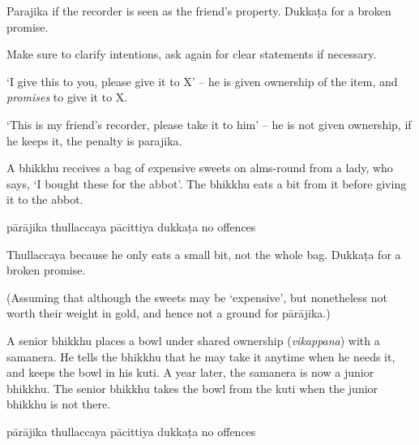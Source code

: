 \begin{exam}{\autoExamName}
\begin{problem*}
\begin{parts}
  \begin{solution}
    Parajika if the recorder is seen as the friend's property.
    Dukkaṭa for a broken promise.

    Make sure to clarify intentions, ask again for
    clear statements if necessary.

    `I give this to you, please give it to X' -- he is given ownership of the
    item, and \emph{promises} to give it to X.

    `This is my friend's recorder, please take it to him' -- he is not given
    ownership, if he keeps it, the penalty is parajika.
  \end{solution}

  \bigskip

  \item A bhikkhu receives a bag of expensive sweets on alms-round from a lady, who
  says, `I bought these for the abbot'. The bhikkhu eats a bit from it before giving it
  to the abbot.

  \bigskip

  \begin{answers}{5}
    \bChoices
     pārājika\eAns
     thullaccaya\eAns
     pācittiya\eAns
     dukkaṭa\eAns
     no offences\eAns
    \eChoices
  \end{answers}

  \begin{solution}
    Thullaccaya because he only eats a small bit, not the whole bag.
    Dukkaṭa for a broken promise.

    (Assuming that although the sweets may be `expensive',
    but nonetheless not worth their weight in gold,
    and hence not a ground for pārājika.)
  \end{solution}

  \bigskip

  \item A senior bhikkhu places a bowl under shared ownership (\emph{vikappana}) with a samanera.
  He tells the bhikkhu that he may take it anytime when he needs it, and keeps the bowl in his kuti.
  A year later, the samanera is now a junior bhikkhu.
  The senior bhikkhu takes the bowl from the kuti when the junior bhikkhu is not there.

  \bigskip

  \begin{answers}{5}
    \bChoices
     pārājika\eAns
     thullaccaya\eAns
     pācittiya\eAns
     dukkaṭa\eAns
     no offences\eAns
    \eChoices
  \end{answers}


\end{parts}
\end{problem*}
\end{exam}
